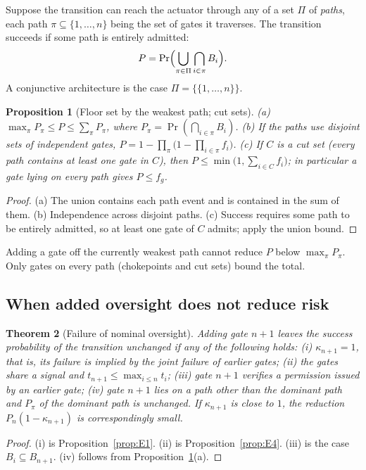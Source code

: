 \documentclass[11pt]{article}
\newtheorem{theorem}{Theorem}[section]
\newtheorem{proposition}[theorem]{Proposition}
\theoremstyle{definition}
\begin{document}
Suppose the transition can reach the actuator through any of a set $\Pi$ of \emph{paths}, each path $\pi\subseteq\{1,\dots,n\}$ being the set of gates it traverses. The transition succeeds if some path is entirely admitted:
\[
P=\Pr\Bigl(\bigcup_{\pi\in\Pi}\bigcap_{i\in\pi}B_i\Bigr).
\]
A conjunctive architecture is the case $\Pi=\{\{1,\dots,n\}\}$.

\begin{proposition}[Floor set by the weakest path; cut sets]\label{prop:E5}
(a) $\max_{\pi}P_\pi\le P\le\sum_\pi P_\pi$, where $P_\pi=\Pr(\bigcap_{i\in\pi}B_i)$. (b) If the paths use disjoint sets of independent gates, $P=1-\prod_\pi\bigl(1-\prod_{i\in\pi}f_i\bigr)$. (c) If $C$ is a \emph{cut set} (every path contains at least one gate in $C$), then $P\le\min\bigl(1,\sum_{i\in C}f_i\bigr)$; in particular a gate lying on every path gives $P\le f_g$.
\end{proposition}
\begin{proof}
(a) The union contains each path event and is contained in the sum of them. (b) Independence across disjoint paths. (c) Success requires some path to be entirely admitted, so at least one gate of $C$ admits; apply the union bound.
\end{proof}

Adding a gate off the currently weakest path cannot reduce $P$ below $\max_\pi P_\pi$. Only gates on every path (chokepoints and cut sets) bound the total.

\subsection{When added oversight does not reduce risk}

\begin{theorem}[Failure of nominal oversight]\label{thm:E1}
Adding gate $n+1$ leaves the success probability of the transition unchanged if any of the following holds: (i) $\kappa_{n+1}=1$, that is, its failure is implied by the joint failure of earlier gates; (ii) the gates share a signal and $t_{n+1}\le\max_{i\le n}t_i$; (iii) gate $n+1$ verifies a permission issued by an earlier gate; (iv) gate $n+1$ lies on a path other than the dominant path and $P_\pi$ of the dominant path is unchanged. If $\kappa_{n+1}$ is close to $1$, the reduction $P_n(1-\kappa_{n+1})$ is correspondingly small.
\end{theorem}
\begin{proof}
(i) is Proposition~\ref{prop:E1}. (ii) is Proposition~\ref{prop:E4}. (iii) is the case $B_i\subseteq B_{n+1}$. (iv) follows from Proposition~\ref{prop:E5}(a).
\end{proof}
\end{document}
